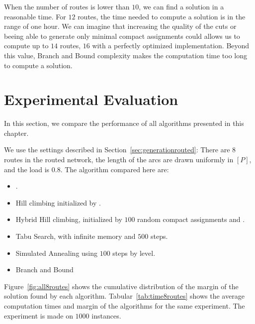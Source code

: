  When the number of routes is lower than $10$, we can find a solution in a reasonable time. For $12$ routes, the time needed to compute a solution is in the range of one hour. We can imagine that increasing the quality of the cuts or beeing able to generate only minimal compact assignments could allows us to compute up to $14$ routes, $16$ with a perfectly optimized implementation. Beyond this value, Branch and Bound complexity makes the computation time too long to compute a solution.




\section{Experimental Evaluation}
\label{sec:evalperfspall}
In this section, we compare the performance of all algorithms presented in this chapter.

 We use the settings described in Section~\ref{sec:generationrouted}: There are $8$ routes in the routed network, the length of the arcs are drawn uniformly in $[P]$, and the load is $0.8$.
 The algorithm compared here are:
 \begin{itemize}
  \item \hybridgreedynormalized.
  \item Hill climbing initialized by \hgn.
  \item Hybrid Hill climbing, initialized by $100$ random compact assignments and \hgn.
  \item Tabu Search, with infinite memory and $500$ steps.
  \item Simulated Annealing using $100$ steps by level.
  \item Branch and Bound
\end{itemize}

Figure~\ref{fig:all8routes} shows the cumulative distribution of the margin of the solution found by each algorithm. Tabular~\ref{tab:time8routes} shows the average computation times and margin of the algorithms for the same experiment. The experiment is made on $1000$ instances.


